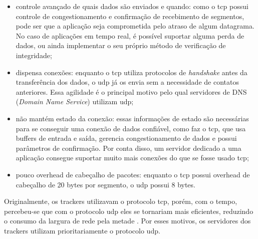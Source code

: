 \begin{itemize}
    \item controle avançado de quais dados são enviados e quando: como o \gls*{tcp}
        possui controle de congestionamento e confirmação de recebimento de segmentos,
        pode ser que a aplicação seja comprometida pelo atraso de algum datagrama. No
        caso de aplicações em tempo real, é possível suportar alguma perda de dados, ou
        ainda implementar o seu próprio método de verificação de integridade;

    \item dispensa conexões: enquanto o \gls*{tcp} utiliza protocolos de
        \emph{handshake} antes da transferência dos dados, o \gls*{udp} já os envia sem
        a necessidade de contatos anteriores. Essa agilidade é o principal motivo pelo
        qual servidores de DNS (\emph{Domain Name Service}) utilizam \gls*{udp};

    \item não mantém estado da conexão: essas informações de estado são necessárias para
        se conseguir uma conexão de dados confiável, como faz o \gls*{tcp}, que usa
        buffers de entrada e saída, gerencia congestionamento de dados e possui
        parâmetros de confirmação. Por conta disso, um servidor dedicado a uma
        aplicação consegue suportar muito mais conexões do que se fosse usado
        \gls*{tcp};

    \item pouco \gls{overhead} de cabeçalho de pacotes: enquanto o \gls*{tcp} possui
        \gls*{overhead} de cabeçalho de 20 bytes por segmento, o \gls*{udp} possui 8
        bytes.
\end{itemize}

Originalmente, os \glspl*{tracker} utilizavam o protocolo \gls*{tcp}, porém, com o
tempo, percebeu-se que com o protocolo \gls*{udp} eles se tornariam mais eficientes,
reduzindo o consumo da largura de rede pela metade \cite{site:tracker-udp}. Por esses
motivos, os servidores dos \glspl*{tracker} utilizam prioritariamente o protocolo
\gls*{udp}.